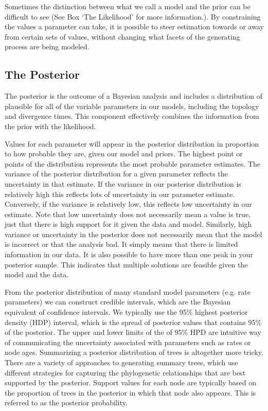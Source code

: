\documentclass[11pt]{article}
\newcommand{\rw}[1]{{\textcolor{red}{[RW: #1]}}} %
\newcommand{\aw}[1]{{\textcolor{armygreen}{[AW: #1]}}} %
\begin{document}
Sometimes the distinction between what we call a model and the prior can be difficult to see (See Box `The Likelihood' for more information.).
By constraining the values a parameter can take, it is possible to steer estimation towards or away from certain sets of values, without changing what facets of the generating process are being modeled. 

\subsection{The Posterior}

The posterior is the outcome of a Bayesian analysis and includes a distribution of plausible for all of the variable parameters in our models, including the topology and divergence times.
This component effectively combines the information from the prior with the likelihood. %

Values for each parameter will appear in the posterior distribution in proportion to how probable they are, given our model and priors.
The highest point or points of the distribution represents the most probable parameter estimates.
The variance of the posterior distribution for a given parameter reflects the uncertainty in that estimate.
If the variance in our posterior distribution is relatively high this reflects lots of uncertainty in our parameter estimate.
Conversely, if the variance is relatively low, this reflects low uncertainty in our estimate.
Note that low uncertainty does not necessarily mean a value is true, just that there is high support for it given the data and model.
Similarly, high variance or uncertainty in the posterior does not necessarily mean that the model is incorrect or that the analysis bad. It simply means that there is limited information in our data.
It is also possible to have more than one peak in your posterior sample.
This indicates that multiple solutions are feasible given the model and the data.

From the posterior distribution of many standard model parameters (e.g. rate parameters) we can construct credible intervals, which are the Bayesian equivalent of confidence intervals.  
We typically use the 95\% highest posterior density (HDP) interval, which is the spread of posterior values that contains 95\% of the posterior.
The upper and lower limits of the of 95\% HPD are intuitive way of communicating the uncertainty associated with parameters such as rates or node ages.
Summarizing a posterior distribution of trees is altogether more tricky.
There are a variety of approaches to generating summary trees, which use different strategies for capturing the phylogenetic relationships that are best supported by the posterior.
Support values for each node are typically based on the proportion of trees in the posterior in which that node also appears. 
This is referred to as the posterior probability. 
\end{document}
